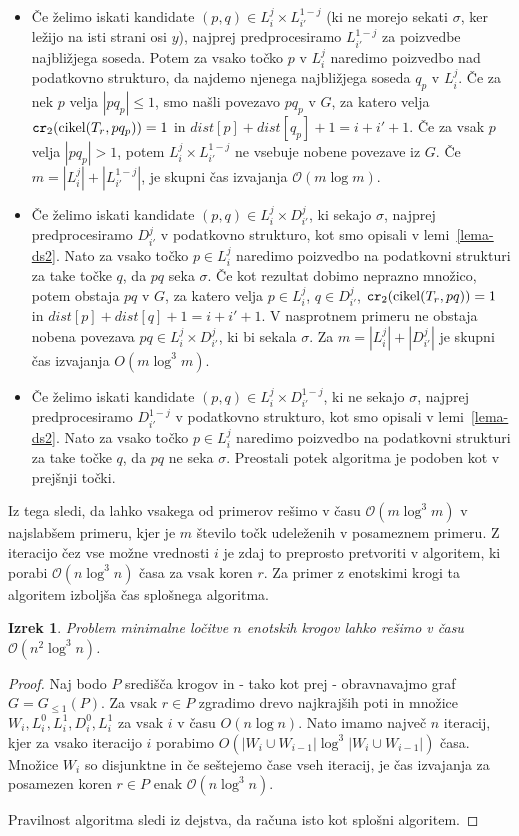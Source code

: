 \documentclass[a4paper, 12pt]{book}
\newcommand{\GG}{\ensuremath{G_{\le 1}}}
\newcommand{\OO}{\ensuremath{\mathcal{O}}} %
\newtheorem{izrek}{Izrek}[chapter]
\def\dist{\mathit{dist}}
\newcommand\CR{\mbox{\tt cr}_2}		  %
\begin{document}
\begin{itemize}
\item Če želimo iskati kandidate $(p,q)\in L_i^j\times L_{i'}^{1-j}$ (ki ne morejo sekati $\sigma$, ker ležijo na isti strani osi $y$), najprej predprocesiramo $L_{i'}^{1-j}$ za poizvedbe najbližjega soseda. Potem za vsako točko $p$ v $L_i^j$ naredimo poizvedbo nad podatkovno strukturo, da najdemo njenega najbližjega soseda $q_p$ v $L_i^j$. Če za nek $p$ velja $|pq_p|\le 1$, smo našli povezavo $pq_p$ v $G$, za katero velja $\CR(\operatorname{cikel}(T_r,pq_p))=1$ in $\dist[p]+\dist[q_p]+1=i+i'+1$. Če za vsak $p$ velja $|pq_p|> 1$, potem $L_i^j\times L_{i'}^{1-j}$ ne vsebuje nobene povezave iz $G$. Če $m=|L_i^j|+|L_{i'}^{1-j}|$, je skupni čas izvajanja $\OO(m\log m)$.
\item Če želimo iskati kandidate $(p,q)\in L_i^j\times D_{i'}^{j}$, ki sekajo $\sigma$, najprej predprocesiramo $D_{i'}^{j}$ v podatkovno strukturo, kot smo opisali v lemi~\ref{lema-ds2}. Nato za vsako točko $p\in L_i^j$ naredimo poizvedbo na podatkovni strukturi za take točke $q$, da $pq$ seka $\sigma$. Če kot rezultat dobimo neprazno množico, potem obstaja $pq$ v $G$, za katero velja $p\in L_i^j$, $q\in D_{i'}^{j}$, $\CR(\operatorname{cikel}(T_r,pq))=1$ in $\dist[p]+\dist[q]+1=i+i'+1$. V nasprotnem primeru ne obstaja nobena povezava $pq\in L_i^j\times D_{i'}^{j}$, ki bi sekala $\sigma$. Za $m=|L_i^j|+|D_{i'}^{j}|$ je skupni čas izvajanja  $O(m\log^3 m)$.
\item Če želimo iskati kandidate $(p,q)\in L_i^j\times D_{i'}^{1-j}$, ki ne sekajo $\sigma$, najprej predprocesiramo $D_{i'}^{1-j}$ v podatkovno strukturo, kot smo opisali v lemi~\ref{lema-ds2}. Nato za vsako točko $p\in L_i^j$ naredimo poizvedbo na podatkovni strukturi za take točke $q$, da $pq$ ne seka $\sigma$. Preostali potek algoritma je podoben kot v prejšnji točki. 
\end{itemize}
Iz tega sledi, da lahko vsakega od primerov rešimo v času $\OO(m\log^3m)$ v najslabšem primeru, kjer je $m$ število točk udeleženih v posameznem primeru. Z iteracijo čez vse možne vrednosti $i$ je zdaj to preprosto pretvoriti v algoritem, ki porabi $\OO(n\log^3n)$ časa za vsak koren $r$. Za primer z enotskimi krogi ta algoritem izboljša čas splošnega algoritma. 
\begin{izrek}
\label{lema4}
Problem minimalne ločitve $n$ enotskih krogov lahko rešimo v času $\OO(n^2\log^3n)$.
\end{izrek}

\begin{proof}
Naj bodo $P$ središča krogov in - tako kot prej - obravnavajmo graf $G=\GG(P)$. Za vsak $r\in P$ zgradimo drevo najkrajših poti in množice $W_i,L_i^0,L_i^1,D_i^0,L_i^1$ za vsak $i$ v času $O(n\log n)$. Nato imamo največ $n$ iteracij, kjer za vsako iteracijo $i$ porabimo $O(|W_i\cup W_{i-1}|\log^3 |W_i\cup W_{i-1}|)$ časa. Množice $W_i$ so disjunktne in če seštejemo čase vseh iteracij, je čas izvajanja za posamezen koren $r\in P$ enak $\OO(n\log^3n)$.

Pravilnost algoritma sledi iz dejstva, da računa isto kot splošni algoritem.
\end{proof}
\end{document}
